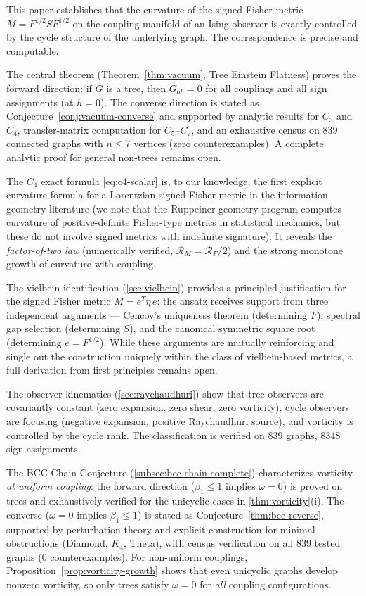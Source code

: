 \documentclass[11pt]{article}
\theoremstyle{definition}
\theoremstyle{remark}
\newcommand{\Fish}{F}
\newcommand{\sgn}{S}
\newcommand{\Met}{M}
\newcommand{\vort}{\omega}
\newcommand{\betti}{\beta_1}
\newcommand{\Ein}{G}
\newcommand{\Scal}{\mathcal{R}}
\begin{document}
This paper establishes that the curvature of the signed Fisher metric
$\Met = \Fish^{1/2}\sgn\Fish^{1/2}$ on the coupling manifold of an
Ising observer is exactly controlled by the cycle structure of the
underlying graph. The correspondence is precise and computable.

The central theorem (Theorem~\ref{thm:vacuum}, Tree Einstein Flatness)
proves the forward direction: if $G$ is a tree, then
$\Ein_{ab} = 0$ for all couplings and all sign assignments (at $h = 0$).
The converse direction is stated as Conjecture~\ref{conj:vacuum-converse}
and supported by analytic results for $C_3$ and $C_4$, transfer-matrix
computation for $C_5$--$C_7$, and an exhaustive census on $839$ connected
graphs with $n \leq 7$ vertices (zero counterexamples). A complete
analytic proof for general non-trees remains open.

The $C_4$ exact formula \eqref{eq:c4-scalar} is, to our knowledge,
the first explicit curvature formula for a Lorentzian signed Fisher
metric in the information geometry literature (we note that the
Ruppeiner geometry program computes curvature of positive-definite
Fisher-type metrics in statistical mechanics, but these do not involve
signed metrics with indefinite signature). It reveals the
\emph{factor-of-two law} (numerically verified, $\Scal_{\Met} = \Scal_{\Fish}/2$) and
the strong monotone growth of curvature with coupling.

The vielbein identification (\cref{sec:vielbein}) provides a principled
justification for the signed Fisher metric $\Met = e^T \eta\, e$: the
ansatz receives support from three independent arguments --- Cencov's
uniqueness theorem (determining $\Fish$), spectral gap selection
(determining $\sgn$), and the canonical symmetric square root
(determining $e = \Fish^{1/2}$). While these arguments are mutually
reinforcing and single out the construction uniquely within the class
of vielbein-based metrics, a full derivation from first principles
remains open.

The observer kinematics (\cref{sec:raychaudhuri}) show that
tree observers are covariantly constant
(zero expansion, zero shear, zero vorticity), cycle observers are
focusing (negative expansion, positive Raychaudhuri source), and
vorticity is controlled by the cycle rank. The classification is
verified on 839 graphs, 8348 sign assignments.

The BCC-Chain Conjecture (\cref{subsec:bcc-chain-complete}) characterizes
vorticity \emph{at uniform coupling}: the forward direction ($\betti \leq 1$
implies $\vort = 0$) is proved on trees and exhaustively verified for
the unicyclic cases in \cref{thm:vorticity}(i). The converse ($\vort = 0$
implies $\betti \leq 1$) is stated as Conjecture~\ref{thm:bcc-reverse},
supported by perturbation theory and explicit construction for minimal
obstructions (Diamond, $K_4$, Theta), with census verification on all
$839$ tested graphs ($0$ counterexamples).
For non-uniform couplings, Proposition~\ref{prop:vorticity-growth} shows
that even unicyclic graphs develop nonzero vorticity, so only trees
satisfy $\vort = 0$ for \emph{all} coupling configurations.
\end{document}

